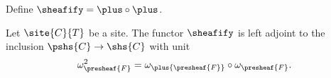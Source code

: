 \begin{definition}
Define $\sheafify = \plus \circ \plus$.
\end{definition}

\begin{lemma}
Let $\site{C}{T}$ be a site.
The functor $\sheafify$ is left adjoint 
to the inclusion $\pshs{C} \rightarrow \shs{C}$
with unit 
\[\omega^2_{\presheaf{F}} = \omega_{\plus{\presheaf{F}}} \circ \omega_{\presheaf{F}}.\]
\end{lemma}


